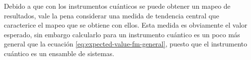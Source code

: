Debido a que con los instrumentos cuánticos se puede obtener un mapeo de
resultados, vale la pena considerar una medida de tendencia central que caracterice el
mapeo que se obtiene con ellos. Esta medida es obviamente el valor esperado,
sin embargo calcularlo para un instrumento cuántico es un poco más general que
la ecuación {\eqref{eq:expected-value-fm-general}}, puesto que el instrumento
cuántico es un ensamble de sistemas.


